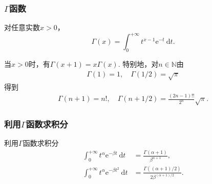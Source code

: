 \begin{frame}
    \frametitle{$\Gamma$函数}

    \begin{mydefinition}[$\Gamma$函数]
        对任意实数$x>0$，
        \begin{equation}
            \Gamma(x)=\int_0^{+\infty}t^{x-1}\mathrm e^{-t}\ \mathrm dt.
        \end{equation}
    \end{mydefinition}

    \begin{myproposition}
        当$x>0$时，有$\Gamma(x+1)=x\Gamma(x)$. 特别地，对$n\in\mathbb{N}$由
        \begin{align*}
            \Gamma(1)=1,\quad
            \Gamma(1/2)=\sqrt\pi
        \end{align*}
        得到
        \begin{align}
            \Gamma(n+1)=n!,\quad
            \Gamma(n+1/2)=\frac{(2n-1)!!}{2^n}\sqrt\pi.
        \end{align}
    \end{myproposition}
\end{frame}

\begin{frame}
    \frametitle{利用$\Gamma$函数求积分}
    \begin{exampleblock}{利用$\Gamma$函数求积分}
        \begin{align}
            \int_0^{+\infty}t^\alpha \mathrm e^{-\beta t}\ \mathrm dt&=\frac{\Gamma(\alpha+1)}{\beta^{\alpha+1}},\\
            \int_0^{+\infty}t^\alpha \mathrm e^{-\beta t^2}\ \mathrm dt&=\frac{\Gamma((\alpha+1)/2)}{2\beta^{(\alpha+1)/2}}.
        \end{align}
    \end{exampleblock}
\end{frame}
